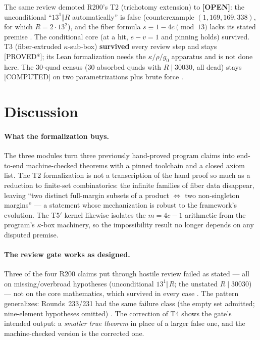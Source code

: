 \documentclass[11pt,a4paper]{article}
\theoremstyle{definition}
\begin{document}
The same review demoted R200's T2 (trichotomy extension) to
\textbf{[OPEN]}: the unconditional ``$13^1\Vert R$ automatically'' is
false (counterexample $(1,169,169,338)$, for which $R=2\cdot13^2$),
and the fiber formula $s\equiv1-4c\pmod{13}$ lacks its stated premise
\cite{D238}. The conditional core (at a hit, $e-v=1$ and pinning
holds) survived. T3 (fiber-extruded $\kappa$-sub-box) \textbf{survived}
every review step \cite{D238} and stays [PROVED*]; its Lean
formalization needs the $\kappa/\rho/g_0$ apparatus and is not done
here. The 30-quad census (30 absorbed quads with $R\mid30030$, all
dead) stays [COMPUTED] on two parametrizations plus brute force
\cite{D200}.

\section{Discussion}

\paragraph{What the formalization buys.} The three modules turn three
previously hand-proved program claims into end-to-end machine-checked
theorems with a pinned toolchain and a closed axiom list. The T2
formalization is not a transcription of the hand proof so much as a
reduction to finite-set combinatorics: the infinite families of fiber
data disappear, leaving ``two distinct full-margin subsets of a
product $\iff$ two non-singleton margins'' --- a statement whose
mechanization is robust to the framework's evolution. The T5$'$ kernel
likewise isolates the $m=4c-1$ arithmetic from the program's
$\kappa$-box machinery, so the impossibility result no longer depends
on any disputed premise.

\paragraph{The review gate works as designed.} Three of the four R200
claims put through hostile review failed as stated --- all on
missing/overbroad hypotheses (unconditional $13^1\Vert R$; the
unstated $R\mid30030$) --- not on the core mathematics, which survived
in every case \cite{D238}. The pattern generalizes: Rounds~233/231 had
the same failure class (the empty set admitted; nine-element
hypotheses omitted) \cite{D238}. The correction of T4 shows the gate's
intended output: a \emph{smaller true theorem} in place of a larger
false one, and the machine-checked version is the corrected one.
\end{document}
